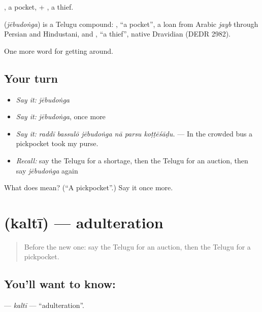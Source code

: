 , a pocket, + , a thief.

\begin{cousinweb}
\textbf{} (\emph{jēbudoṅga}) is a Telugu compound: , \textquotedblleft{}a pocket\textquotedblright{}, a loan from Arabic \emph{jayb} through Persian and Hindustani, and , \textquotedblleft{}a thief\textquotedblright{}, native Dravidian (DEDR 2982).
\end{cousinweb}

\begin{grammarlens}[title={What you've built}]
One more word for getting around.
\end{grammarlens}

\subsection*{Your turn}
\begin{itemize}
\raggedright
  \item \emph{Say it:} \emph{jēbudoṅga}
  \item \emph{Say it:} \emph{jēbudoṅga}, once more
  \item \emph{Say it:} \emph{raddī bassulō jēbudoṅga nā parsu koṭṭēśāḍu.} — In the crowded bus a pickpocket took my purse.
  \item \emph{Recall:} say the Telugu for a shortage, then the Telugu for an auction, then say \emph{jēbudoṅga} again
\end{itemize}

\begin{tcolorbox}[breakable,colback=teal!4,colframe=teal!35!black,title={Before you move on}]
What does  mean? (\textquotedblleft{}A pickpocket\textquotedblright{}.) Say it once more.
\end{tcolorbox}
\section[\texorpdfstring{\te{కల్తీ} (kaltī)}{కల్తీ (kaltī)}]{ (kaltī) — adulteration}

\label{lesson:TE-C489-kalti}



\begin{quote}
Before the new one: say the Telugu for an auction, then the Telugu for a pickpocket.
\end{quote}

\subsection*{You'll want to know: }
\textbf{} — \emph{kaltī} — \textquotedblleft{}adulteration\textquotedblright{}.

